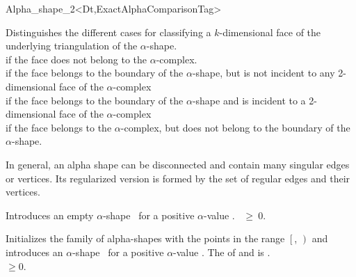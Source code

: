 \begin{ccRefClass} {Alpha_shape_2<Dt,ExactAlphaComparisonTag>}





{Distinguishes the different cases for classifying a $k$-dimensional face
 of the underlying triangulation of the $\alpha$-shape. \\
 if the face does not belong to the $\alpha$-complex.\\
 if the face belongs to the boundary of the $\alpha$-shape,
 but is not incident to any 2-dimensional face of the $\alpha$-complex\\
 if the face belongs to the boundary of the $\alpha$-shape
 and is incident to a 2-dimensional face of the $\alpha$-complex\\
 if the face belongs to the $\alpha$-complex, but does
not belong to the boundary of the $\alpha$-shape.\\}

{ In general, an alpha shape can be disconnected and contain many singular edges 
or vertices. Its regularized version is formed by the set of regular edges
and their vertices.}

\ccCreation
{}

{Introduces an empty $\alpha$-shape \ccVar\ for a positive $\alpha$-value
 .
\ccPrecond {}~$\geq~0$.}


{Initializes the family of alpha-shapes with the points in the range
$\left[\right.$, $\left.\right)$ and 
introduces an $\alpha$-shape \ccVar\ for a positive $\alpha$-value
.  
\ccPrecond The  of  and
 is .\\
 $\geq 0$.}


\end{ccRefClass}
